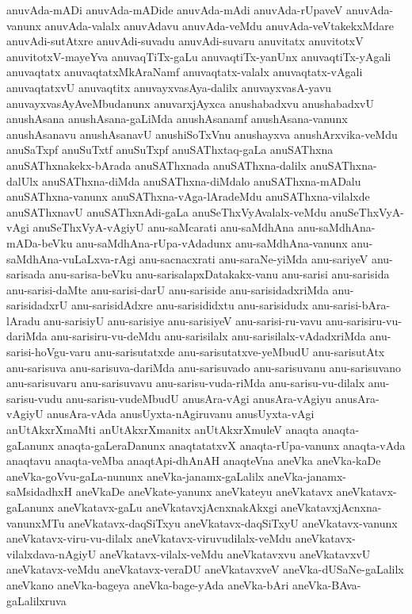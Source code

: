 {anuvAda-mADi
anuvAda-mADide
anuvAda-mAdi
anuvAda-rUpaveV
anuvAda-vanunx
anuvAda-valalx
anuvAdavu
anuvAda-veMdu
anuvAda-veVtakekxMdare
anuvAdi-sutAtxre
anuvAdi-suvadu
anuvAdi-suvaru
anuvitatx
anuvitotxV
anuvitotxV-mayeYva
anuvaqTiTx-gaLu
anuvaqtiTx-yanUnx
anuvaqtiTx-yAgali
anuvaqtatx
anuvaqtatxMkAraNamf
anuvaqtatx-valalx
anuvaqtatx-vAgali
anuvaqtatxvU
anuvaqtitx
anuvayxvasAya-dalilx
anuvayxvasA-yavu
anuvayxvasAyAveMbudanunx
anuvarxjAyxca
anushabadxvu
anushabadxvU
anushAsana
anushAsana-gaLiMda
anushAsanamf
anushAsana-vanunx
anushAsanavu
anushAsanavU
anushiSoTxVnu
anushayxva
anushArxvika-veMdu
anuSaTxpf
anuSuTxtf
anuSuTxpf
anuSAThxtaq-gaLa
anuSAThxna
anuSAThxnakekx-bArada
anuSAThxnada
anuSAThxna-dalilx
anuSAThxna-dalUlx
anuSAThxna-diMda
anuSAThxna-diMdalo
anuSAThxna-mADalu
anuSAThxna-vanunx
anuSAThxna-vAga-lAradeMdu
anuSAThxna-vilalxde
anuSAThxnavU
anuSAThxnAdi-gaLa
anuSeThxVyAvalalx-veMdu
anuSeThxVyA-vAgi
anuSeThxVyA-vAgiyU
anu-saMcarati
anu-saMdhAna
anu-saMdhAna-mADa-beVku
anu-saMdhAna-rUpa-vAdadunx
anu-saMdhAna-vanunx
anu-saMdhAna-vuLaLxva-rAgi
anu-sacnacxrati
anu-saraNe-yiMda
anu-sariyeV
anu-sarisada
anu-sarisa-beVku
anu-sarisalapxDatakakx-vanu
anu-sarisi
anu-sarisida
anu-sarisi-daMte
anu-sarisi-darU
anu-sariside
anu-sarisidadxriMda
anu-sarisidadxrU
anu-sarisidAdxre
anu-sarisididxtu
anu-sarisidudx
anu-sarisi-bAra-lAradu
anu-sarisiyU
anu-sarisiye
anu-sarisiyeV
anu-sarisi-ru-vavu
anu-sarisiru-vu-dariMda
anu-sarisiru-vu-deMdu
anu-sarisilalx
anu-sarisilalx-vAdadxriMda
anu-sarisi-hoVgu-varu
anu-sarisutatxde
anu-sarisutatxve-yeMbudU
anu-sarisutAtx
anu-sarisuva
anu-sarisuva-dariMda
anu-sarisuvado
anu-sarisuvanu
anu-sarisuvano
anu-sarisuvaru
anu-sarisuvavu
anu-sarisu-vuda-riMda
anu-sarisu-vu-dilalx
anu-sarisu-vudu
anu-sarisu-vudeMbudU
anusAra-vAgi
anusAra-vAgiyu
anusAra-vAgiyU
anusAra-vAda
anusUyxta-nAgiruvanu
anusUyxta-vAgi
anUtAkxrXmaMti
anUtAkxrXmanitx
anUtAkxrXmuleV
anaqta
anaqta-gaLanunx
anaqta-gaLeraDanunx
anaqtatatxvX
anaqta-rUpa-vanunx
anaqta-vAda
anaqtavu
anaqta-veMba
anaqtApi-dhAnAH
anaqteVna
aneVka
aneVka-kaDe
aneVka-goVvu-gaLa-nununx
aneVka-janamx-gaLalilx
aneVka-janamx-saMsidadhxH
aneVkaDe
aneVkate-yanunx
aneVkateyu
aneVkatavx
aneVkatavx-gaLanunx
aneVkatavx-gaLu
aneVkatavxjAcnxnakAkxgi
aneVkatavxjAcnxna-vanunxMTu
aneVkatavx-daqSiTxyu
aneVkatavx-daqSiTxyU
aneVkatavx-vanunx
aneVkatavx-viru-vu-dilalx
aneVkatavx-viruvudilalx-veMdu
aneVkatavx-vilalxdava-nAgiyU
aneVkatavx-vilalx-veMdu
aneVkatavxvu
aneVkatavxvU
aneVkatavx-veMdu
aneVkatavx-veraDU
aneVkatavxveV
aneVka-dUSaNe-gaLalilx
aneVkano
aneVka-bageya
aneVka-bage-yAda
aneVka-bAri
aneVka-BAva-gaLalilxruva
}
